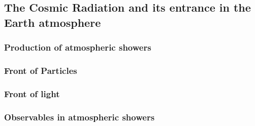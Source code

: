 \subsection{The Cosmic Radiation and its entrance in the
Earth atmosphere}

\elemespectrofig

\subsubsection{Production of atmospheric showers}

\subsubsection{Front of Particles}

\subsubsection{Front of \Cherenkov light}

\subsubsection{Observables in atmospheric showers}

\endinput


%

